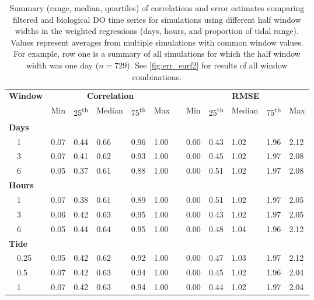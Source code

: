 \documentclass[letterpaper,12pt,oneside]{article}\usepackage[]{graphicx}\usepackage[]{color}
\begin{document}
\begin{table}[!tbp]
\caption{Summary (range, median, quartiles) of correlations and error estimates comparing filtered and biological \ac{DO} time series for simulations using different half window widths in the weighted regressions (days, hours, and proportion of tidal range).  Values represent averages from multiple simulations with common window values. For example, row one is a summary of all simulations for which the half window width was one day ($n=729$). See \cref{fig:err_surf2} for results of all window combinations.\label{tab:dtd_perf2}} 
\begin{center}
\begin{tabular}{llllllclllll}
\hline\hline
\multicolumn{1}{l}{\bfseries Window}&\multicolumn{5}{c}{\bfseries Correlation}&\multicolumn{1}{c}{\bfseries }&\multicolumn{5}{c}{\bfseries RMSE}\tabularnewline
\cline{2-6} \cline{8-12}
\multicolumn{1}{l}{}&\multicolumn{1}{c}{Min}&\multicolumn{1}{c}{25\textsuperscript{th}}&\multicolumn{1}{c}{Median}&\multicolumn{1}{c}{75\textsuperscript{th}}&\multicolumn{1}{c}{Max}&\multicolumn{1}{c}{}&\multicolumn{1}{c}{Min}&\multicolumn{1}{c}{25\textsuperscript{th}}&\multicolumn{1}{c}{Median}&\multicolumn{1}{c}{75\textsuperscript{th}}&\multicolumn{1}{c}{Max}\tabularnewline
\hline
{\bfseries Days}&&&&&&&&&&&\tabularnewline
~~1&0.07&0.44&0.66&0.96&1.00&&0.00&0.43&1.02&1.96&2.12\tabularnewline
~~3&0.07&0.41&0.62&0.93&1.00&&0.00&0.45&1.02&1.97&2.08\tabularnewline
~~6&0.05&0.37&0.61&0.88&1.00&&0.00&0.51&1.02&1.97&2.08\tabularnewline
\hline
{\bfseries Hours}&&&&&&&&&&&\tabularnewline
~~1&0.07&0.38&0.61&0.89&1.00&&0.00&0.51&1.02&1.97&2.05\tabularnewline
~~3&0.06&0.42&0.63&0.95&1.00&&0.00&0.43&1.02&1.97&2.05\tabularnewline
~~6&0.05&0.44&0.64&0.95&1.00&&0.00&0.48&1.04&1.96&2.12\tabularnewline
\hline
{\bfseries Tide}&&&&&&&&&&&\tabularnewline
~~0.25&0.05&0.42&0.62&0.92&1.00&&0.00&0.47&1.03&1.97&2.12\tabularnewline
~~0.5&0.07&0.42&0.63&0.94&1.00&&0.00&0.45&1.02&1.96&2.04\tabularnewline
~~1&0.07&0.42&0.63&0.94&1.00&&0.00&0.44&1.02&1.97&2.04\tabularnewline
\hline
\end{tabular}\end{center}

\end{table}
\end{document}

